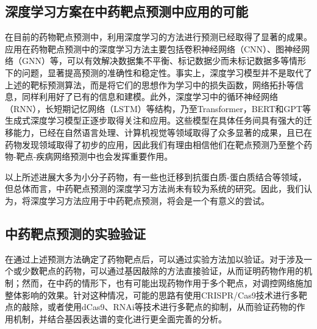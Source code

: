 \subsection{深度学习方案在中药靶点预测中应用的可能}

在目前的药物靶点预测中，利用深度学习的方法进行预测已经取得了显著的成果。应用在药物靶点预测中的深度学习方法主要包括卷积神经网络（CNN）、图神经网络（GNN）等\cite{Tsubaki_Tomii_Sese_2019}，可以有效解决数据集不平衡、标记数据少而未标记数据多等情形下的问题，显著提高预测的准确性和稳定性。事实上，深度学习模型并不是取代了上述的靶标预测算法，而是将它们的思想作为学习中的损失函数，网络拓扑等信息，同样利用好了已有的信息和建模。此外，深度学习中的循环神经网络（RNN），长短期记忆网络（LSTM）等结构，乃至Transformer，BERT和GPT等生成式深度学习模型正逐步取得关注和应用。这些模型在具体任务间具有强大的迁移能力，已经在自然语言处理、计算机视觉等领域取得了众多显著的成果，且已在药物发现领域取得了初步的应用，因此我们有理由相信他们在靶点预测乃至整个药物-靶点-疾病网络预测中也会发挥重要作用\cite{Haroon_C.a._A.s._2023}。

以上所述进展大多为小分子药物，有一些也迁移到抗蛋白质-蛋白质结合等领域，但总体而言，中药靶点预测的深度学习方法尚未有较为系统的研究。因此，我们认为，将深度学习方法应用于中药靶点预测，将会是一个有意义的尝试。

\subsection{中药靶点预测的实验验证}

在通过上述预测方法确定了药物靶点后，可以通过实验方法加以验证。对于涉及一个或少数靶点的药物，可以通过基因敲除的方法直接验证，从而证明药物作用的机制；然而，在中药的情形下，也有可能出现药物作用于多个靶点，对调控网络施加整体影响的效果。针对这种情况，可能的思路有使用CRISPR/Cas9\cite{Cong_Ran_Cox_Lin_Barretto_Habib_Hsu_Wu_Jiang_Marraffini_et_al._2013}技术进行多靶点的敲除，或者使用dCas9\cite{Jiang_Geng_Wang_Liang_Guo_Liu_Zhao_Jin_Liu_Mu_2023}、RNAi\cite{Zimmermann_Lehár_Keith_2007}等技术进行多靶点的抑制，从而验证药物的作用机制，并结合基因表达谱的变化进行更全面完善的分析。
